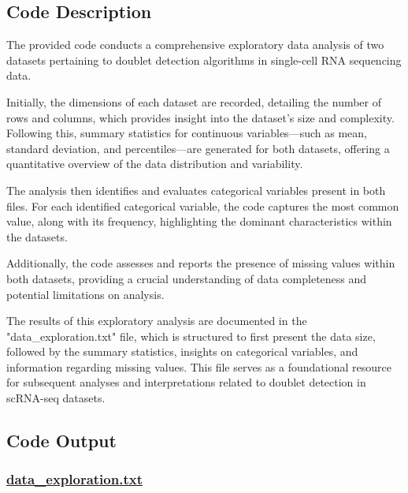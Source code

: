 \documentclass[11pt]{article}
\begin{document}
\subsection{Code Description}

The provided code conducts a comprehensive exploratory data analysis of two datasets pertaining to doublet detection algorithms in single-cell RNA sequencing data. 

Initially, the dimensions of each dataset are recorded, detailing the number of rows and columns, which provides insight into the dataset's size and complexity. Following this, summary statistics for continuous variables—such as mean, standard deviation, and percentiles—are generated for both datasets, offering a quantitative overview of the data distribution and variability.

The analysis then identifies and evaluates categorical variables present in both files. For each identified categorical variable, the code captures the most common value, along with its frequency, highlighting the dominant characteristics within the datasets.

Additionally, the code assesses and reports the presence of missing values within both datasets, providing a crucial understanding of data completeness and potential limitations on analysis.

The results of this exploratory analysis are documented in the "data\_exploration.txt" file, which is structured to first present the data size, followed by the summary statistics, insights on categorical variables, and information regarding missing values. This file serves as a foundational resource for subsequent analyses and interpretations related to doublet detection in scRNA-seq datasets.

\subsection{Code Output}\hypertarget{file-data-exploration-txt}{}

\subsubsection*{\hyperlink{code-Data Exploration-data-exploration-txt}{data\_exploration.txt}}
\end{document}
